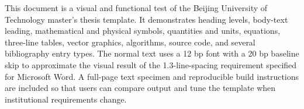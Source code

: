 \begin{eabstract}
This document is a visual and functional test of the Beijing University of Technology master's thesis template. It demonstrates heading levels, body-text leading, mathematical and physical symbols, quantities and units, equations, three-line tables, vector graphics, algorithms, source code, and several bibliography entry types. The normal text uses a 12 bp font with a 20 bp baseline skip to approximate the visual result of the 1.3-line-spacing requirement specified for Microsoft Word. A full-page text specimen and reproducible build instructions are included so that users can compare output and tune the template when institutional requirements change.

\end{eabstract}
